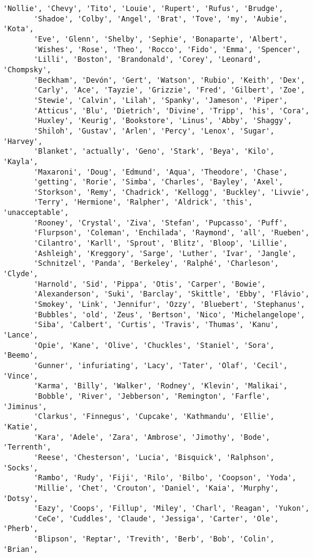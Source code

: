 \documentclass[11pt]{article}
\begin{document}
\begin{tcolorbox}[breakable, size=fbox, boxrule=.5pt, pad at break*=1mm, opacityfill=0]
\begin{Verbatim}[commandchars=\\\{\}]
       'Nollie', 'Chevy', 'Tito', 'Louie', 'Rupert', 'Rufus', 'Brudge',
       'Shadoe', 'Colby', 'Angel', 'Brat', 'Tove', 'my', 'Aubie', 'Kota',
       'Eve', 'Glenn', 'Shelby', 'Sephie', 'Bonaparte', 'Albert',
       'Wishes', 'Rose', 'Theo', 'Rocco', 'Fido', 'Emma', 'Spencer',
       'Lilli', 'Boston', 'Brandonald', 'Corey', 'Leonard', 'Chompsky',
       'Beckham', 'Devón', 'Gert', 'Watson', 'Rubio', 'Keith', 'Dex',
       'Carly', 'Ace', 'Tayzie', 'Grizzie', 'Fred', 'Gilbert', 'Zoe',
       'Stewie', 'Calvin', 'Lilah', 'Spanky', 'Jameson', 'Piper',
       'Atticus', 'Blu', 'Dietrich', 'Divine', 'Tripp', 'his', 'Cora',
       'Huxley', 'Keurig', 'Bookstore', 'Linus', 'Abby', 'Shaggy',
       'Shiloh', 'Gustav', 'Arlen', 'Percy', 'Lenox', 'Sugar', 'Harvey',
       'Blanket', 'actually', 'Geno', 'Stark', 'Beya', 'Kilo', 'Kayla',
       'Maxaroni', 'Doug', 'Edmund', 'Aqua', 'Theodore', 'Chase',
       'getting', 'Rorie', 'Simba', 'Charles', 'Bayley', 'Axel',
       'Storkson', 'Remy', 'Chadrick', 'Kellogg', 'Buckley', 'Livvie',
       'Terry', 'Hermione', 'Ralpher', 'Aldrick', 'this', 'unacceptable',
       'Rooney', 'Crystal', 'Ziva', 'Stefan', 'Pupcasso', 'Puff',
       'Flurpson', 'Coleman', 'Enchilada', 'Raymond', 'all', 'Rueben',
       'Cilantro', 'Karll', 'Sprout', 'Blitz', 'Bloop', 'Lillie',
       'Ashleigh', 'Kreggory', 'Sarge', 'Luther', 'Ivar', 'Jangle',
       'Schnitzel', 'Panda', 'Berkeley', 'Ralphé', 'Charleson', 'Clyde',
       'Harnold', 'Sid', 'Pippa', 'Otis', 'Carper', 'Bowie',
       'Alexanderson', 'Suki', 'Barclay', 'Skittle', 'Ebby', 'Flávio',
       'Smokey', 'Link', 'Jennifur', 'Ozzy', 'Bluebert', 'Stephanus',
       'Bubbles', 'old', 'Zeus', 'Bertson', 'Nico', 'Michelangelope',
       'Siba', 'Calbert', 'Curtis', 'Travis', 'Thumas', 'Kanu', 'Lance',
       'Opie', 'Kane', 'Olive', 'Chuckles', 'Staniel', 'Sora', 'Beemo',
       'Gunner', 'infuriating', 'Lacy', 'Tater', 'Olaf', 'Cecil', 'Vince',
       'Karma', 'Billy', 'Walker', 'Rodney', 'Klevin', 'Malikai',
       'Bobble', 'River', 'Jebberson', 'Remington', 'Farfle', 'Jiminus',
       'Clarkus', 'Finnegus', 'Cupcake', 'Kathmandu', 'Ellie', 'Katie',
       'Kara', 'Adele', 'Zara', 'Ambrose', 'Jimothy', 'Bode', 'Terrenth',
       'Reese', 'Chesterson', 'Lucia', 'Bisquick', 'Ralphson', 'Socks',
       'Rambo', 'Rudy', 'Fiji', 'Rilo', 'Bilbo', 'Coopson', 'Yoda',
       'Millie', 'Chet', 'Crouton', 'Daniel', 'Kaia', 'Murphy', 'Dotsy',
       'Eazy', 'Coops', 'Fillup', 'Miley', 'Charl', 'Reagan', 'Yukon',
       'CeCe', 'Cuddles', 'Claude', 'Jessiga', 'Carter', 'Ole', 'Pherb',
       'Blipson', 'Reptar', 'Trevith', 'Berb', 'Bob', 'Colin', 'Brian',

\end{Verbatim}
\end{tcolorbox}
\end{document}
